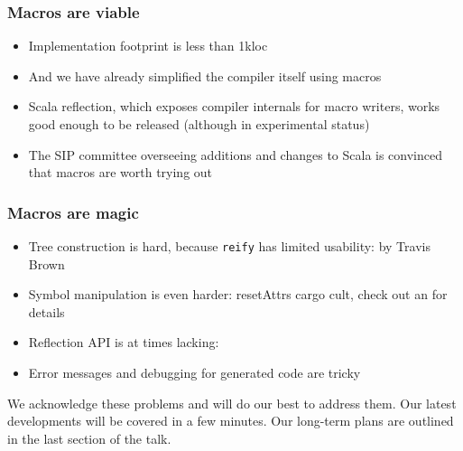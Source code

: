 \documentclass[svgnames,hyperref={bookmarks=false}]{beamer}
\begin{document}
\begin{frame}[fragile]
\frametitle{Macros are viable}

\begin{itemize}
\item Implementation footprint is less than 1kloc
\item And we have already simplified the compiler itself using macros
\item Scala reflection, which exposes compiler internals for macro writers, works good enough to be released (although in experimental status)
\item The SIP committee overseeing additions and changes to Scala is convinced that macros are worth trying out
\end{itemize}
\end{frame}

\begin{frame}[fragile]
\frametitle{Macros are magic}

\begin{itemize}
\item Tree construction is hard, because \texttt{reify} has limited usability:  by Travis Brown
\item Symbol manipulation is even harder: resetAttrs cargo cult, check out an  for details
\item Reflection API is at times lacking: 
\item Error messages and debugging for generated code are tricky
\end{itemize}
We acknowledge these problems and will do our best to address them. Our latest developments will be covered in a few minutes. Our long-term plans are outlined in the last section of the talk.
\end{frame}

\begin{frame}[fragile]
\frametitle{}

\vskip40pt
\begin{center}
\end{center}
\end{frame}
\end{document}
